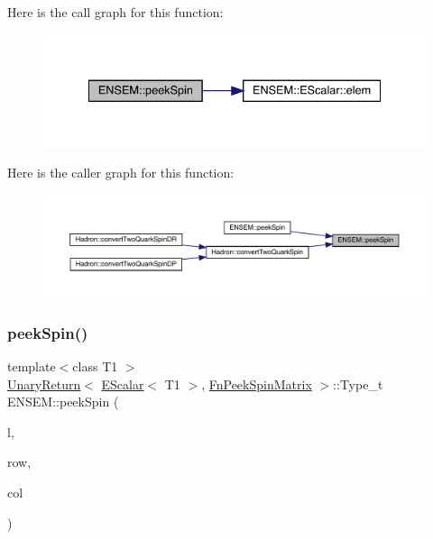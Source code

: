Here is the call graph for this function\+:
\nopagebreak
\begin{figure}[H]
\begin{center}
\leavevmode
\includegraphics[width=334pt]{d4/dca/group__escalar_gaa833c21339250a427d537f2c3431f9e2_cgraph}
\end{center}
\end{figure}
Here is the caller graph for this function\+:
\nopagebreak
\begin{figure}[H]
\begin{center}
\leavevmode
\includegraphics[width=350pt]{d4/dca/group__escalar_gaa833c21339250a427d537f2c3431f9e2_icgraph}
\end{center}
\end{figure}
\mbox{\label{group__escalar_gadd6441efc37438418dda6c0e5a501f10}} 
\subsubsection{\texorpdfstring{peekSpin()}{peekSpin()}\hspace{0.1cm}{\footnotesize\ttfamily [2/2]}}
{\footnotesize\ttfamily template$<$class T1 $>$ \\
\mbox{\hyperlink{structENSEM_1_1UnaryReturn}{Unary\+Return}}$<$ \mbox{\hyperlink{classENSEM_1_1EScalar}{E\+Scalar}}$<$ T1 $>$, \mbox{\hyperlink{structENSEM_1_1FnPeekSpinMatrix}{Fn\+Peek\+Spin\+Matrix}} $>$\+::Type\+\_\+t E\+N\+S\+E\+M\+::peek\+Spin (\begin{DoxyParamCaption}\item[{const \mbox{\hyperlink{classENSEM_1_1EScalar}{E\+Scalar}}$<$ T1 $>$ \&}]{l,  }\item[{int}]{row,  }\item[{int}]{col }\end{DoxyParamCaption})\hspace{0.3cm}{\ttfamily [inline]}}


